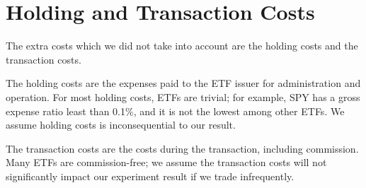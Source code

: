 \section{Holding and Transaction Costs}
The extra costs which we did not take into account are the holding costs and the transaction costs.
\par
The holding costs are the expenses paid to the ETF issuer for administration and operation. For most holding costs, ETFs are trivial; for example, SPY has a  gross expense ratio least than 0.1\%, and it is not the lowest among other ETFs. We assume holding costs is inconsequential to our result.
\par
The transaction costs are the costs during the transaction, including commission. Many ETFs are commission-free; we assume the transaction costs will not significantly impact our experiment result if we trade infrequently.